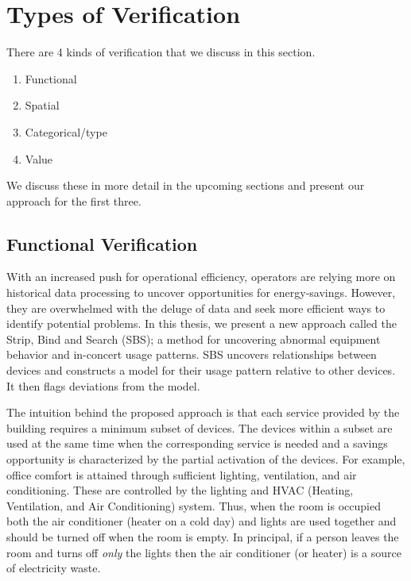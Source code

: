 \section{Types of Verification}
There are 4 kinds of verification that we discuss in this section.

\begin{enumerate}
\item Functional
\item Spatial
\item Categorical/type
\item Value
\end{enumerate}

We discuss these in more detail in the upcoming sections and present our approach for the first three.

\subsection{Functional Verification}%
With an increased push for operational efficiency, operators are relying more on historical data processing to uncover opportunities for energy-savings.
However, they are overwhelmed with the deluge of data and seek more efficient ways to identify potential problems.
In this thesis, we present a new approach called the Strip, Bind and Search (SBS); a method for uncovering abnormal 
equipment behavior and in-concert usage patterns.
SBS uncovers relationships between devices and constructs a model for their usage pattern relative to other devices.
It then flags deviations from the model. 


The intuition behind the proposed approach is that each service provided by the building requires a minimum subset of devices.
The devices within a subset are used at the same time when the corresponding service is needed and a savings opportunity is characterized by the partial activation of the devices.
For example, office comfort is attained through sufficient lighting, ventilation, and air conditioning.
These are controlled by the lighting and HVAC (Heating, Ventilation, and Air Conditioning) system.
Thus, when the room is occupied both the air conditioner (heater on a cold day) and lights are used together and should be turned off 
when the room is empty.
In principal, if a person leaves the room and turns off \emph{only} the lights then the air conditioner (or heater) is a source of electricity waste.

